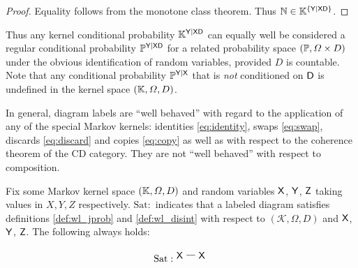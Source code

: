 \begin{proof}
Equality follows from the monotone class theorem. Thus $\mathbb{N}\in \mathbb{K}^{\{\mathsf{Y}|\mathsf{X}\mathsf{D}\}}$.
\end{proof}

Thus any kernel conditional probability $\mathbb{K}^{\mathsf{Y}|\mathsf{X}\mathsf{D}}$ can equally well be considered a regular conditional probability $\mathbb{P}^{\mathsf{Y}|\mathsf{X}\mathsf{D}}$ for a related probability space $(\mathbb{P},\Omega\times D)$ under the obvious identification of random variables, provided $D$ is countable. Note that any conditional probability $\mathbb{P}^{\mathsf{Y}|\mathsf{X}}$ that is \emph{not} conditioned on $\mathsf{D}$ is undefined in the kernel space $(\mathbb{K},\Omega,D)$.

\begin{lemma}

In general, diagram labels are ``well behaved'' with regard to the application of any of the special Markov kernels: identities \ref{eq:identity}, swaps \ref{eq:swap}, discards \ref{eq:discard} and copies \ref{eq:copy} as well as with respect to the coherence theorem of the CD category. They are not ``well behaved'' with respect to composition.

Fix some Markov kernel space $(\mathbb{K},\Omega,D)$ and random variables $\mathsf{X}$, $\mathsf{Y}$, $\mathsf{Z}$ taking values in $X,Y,Z$ respectively. $\mathrm{Sat:}$ indicates that a labeled diagram satisfies definitions \ref{def:wl_jprob} and \ref{def:wl_disint} with respect to $(\mathscr{K},\Omega,D)$ and $\mathsf{X}$, $\mathsf{Y}$, $\mathsf{Z}$.  The following always holds:

\begin{align}
\mathrm{Sat:}
\begin{tikzpicture}
\path (0,0) node (A) {$\RV{X}$}
++(0.8,0) node (X) {$\RV{X}$};
\draw (A) -- (X);
\end{tikzpicture}
\end{align}


\end{lemma}
